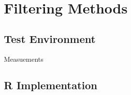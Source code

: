 \chapter{Filtering Methods}
\label{chap:filteringMethods}

\section{Test Environment}
Measuements

\section{R Implementation}